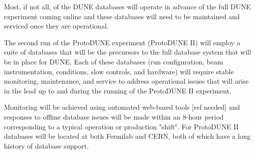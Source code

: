 Most, if not all, of the DUNE databases will operate in advance of the full DUNE experiment coming online and these databases will need to be maintained and serviced once they are operational. 

The second run of the ProtoDUNE experiment (ProtoDUNE II) will employ a suite of databases that will be the precursors to the full database system that will be in place for DUNE. Each of these databases (run configuration, beam instrumentation, conditions, slow controls, and hardware) will require stable monitoring, maintenance, and service to address operational issues that will arise in the lead up to and during the running of the ProtoDUNE II experiment. 

Monitoring will be achieved using automated web-based tools [ref needed] and responses to offline database issues will be made within an 8-hour period corresponding to a typical operation or production "shift". For ProtoDUNE II databases will be located at both Fermilab and CERN, both of which have a long history of database support.



